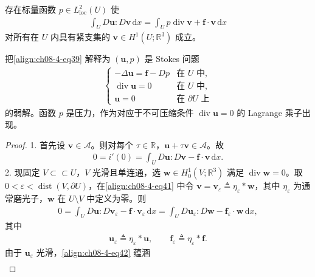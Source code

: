 \documentclass[../../main.tex]{subfiles}
\begin{document}
\begin{theorem}\label{theorem:ch08-4-6-压力乘子}
存在标量函数 $p\in L^2_{\mathrm{loc}}(U)$ 使
\begin{align}
\int_U D\mathbf{u}:D\mathbf{v}\,\mathrm{d}x=\int_U p\operatorname{div}\mathbf{v}+\mathbf{f}\cdot\mathbf{v}\,\mathrm{d}x\label{align:ch08-4-eq39}
\end{align}
对所有在 $U$ 内具有紧支集的 $\mathbf{v}\in H^1(U;\mathbb{R}^3)$ 成立。

把\eqref{align:ch08-4-eq39} 解释为 $(\mathbf{u},p)$ 是 Stokes 问题
\begin{align}
\begin{cases}
-\Delta\mathbf{u}=\mathbf{f}-Dp&\text{在 }U\text{ 中},\\
\operatorname{div}\mathbf{u}=0&\text{在 }U\text{ 中},\\
\mathbf{u}=0&\text{在 }\partial U\text{ 上}
\end{cases}\label{align:ch08-4-eq40}
\end{align}
的弱解。函数 $p$ 是压力，作为对应于不可压缩条件 $\operatorname{div}\mathbf{u}=0$ 的 Lagrange 乘子出现。
\begin{proof}
1. 首先设 $\mathbf{v}\in\mathcal{A}$。则对每个 $\tau\in\mathbb{R}$，$\mathbf{u}+\tau\mathbf{v}\in\mathcal{A}$。故
\begin{align}
0=i'(0)=\int_U D\mathbf{u}:D\mathbf{v}-\mathbf{f}\cdot\mathbf{v}\,\mathrm{d}x.\label{align:ch08-4-eq41}
\end{align}
2. 现固定 $V\subset \subset U$，$V$ 光滑且单连通，选 $\mathbf{w}\in H_0^1(V;\mathbb{R}^3)$ 满足 $\operatorname{div}\mathbf{w}=0$。取 $0<\varepsilon<\operatorname{dist}(V,\partial U)$，在\eqref{align:ch08-4-eq41} 中令 $\mathbf{v}=\mathbf{v}_\varepsilon\triangleq\eta_\varepsilon*\mathbf{w}$，其中 $\eta_\varepsilon$ 为通常磨光子，$\mathbf{w}$ 在 $U\setminus V$ 中定义为零。则
\begin{align}
0=\int_U D\mathbf{u}:D\mathbf{v}_\varepsilon-\mathbf{f}\cdot\mathbf{v}_\varepsilon\,\mathrm{d}x=\int_U D\mathbf{u}_\varepsilon:D\mathbf{w}-\mathbf{f}_\varepsilon\cdot\mathbf{w}\,\mathrm{d}x,\label{align:ch08-4-eq42}
\end{align}
其中
\begin{align}
\mathbf{u}_\varepsilon\triangleq\eta_\varepsilon*\mathbf{u},\qquad \mathbf{f}_\varepsilon\triangleq\eta_\varepsilon*\mathbf{f}.\label{align:ch08-4-eq43}
\end{align}
由于 $\mathbf{u}_\varepsilon$ 光滑，\eqref{align:ch08-4-eq42} 蕴涵
\begin{align}

\end{align}
\end{proof}
\end{theorem}
\end{document}
